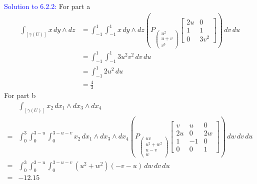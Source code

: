 \documentclass[12pt]{article}
\begin{document}
\smallskip

\textcolor{blue}{Solution to 6.2.2:}
For part a
\begin{align*}
    \int_{[\gamma(U)]} x\, dy \wedge dz
    &= \int_{-1}^1 \int_{-1}^1 x\, dy \wedge dz
        \left(
            P_{\begin{pmatrix}
                u^2 \\ u+v \\ v^3
            \end{pmatrix}}
            \begin{bmatrix}
                2u & 0 \\
                1 & 1 \\
                0 & 3v^2
            \end{bmatrix}
        \right) \,dv \,du \\ 
    &= \int_{-1}^1 \int_{-1}^1 3u^2v^2 \,dv \,du \\
    &= \int_{-1}^1 2u^2 \,du \\
    &= \frac{4}{3}
\end{align*}
For part b
\begin{align*}
    &\int_{[\gamma(U)]} x_2\, dx_1 \wedge dx_3 \wedge dx_4 \\
    =& \int_0^3 \int_0^{3-u} \int_0^{3-u-v} x_2\, dx_1 \wedge dx_3 \wedge dx_4 
        \left(
            P_{\begin{pmatrix}
                uv \\ u^2+w^2 \\ u-v \\ w
            \end{pmatrix}}
            \begin{bmatrix}
                v & u & 0\\
                2u & 0 & 2w\\
                1 & -1 & 0\\
                0 & 0 & 1
            \end{bmatrix}
        \right)
    \,dw \,dv \,du \\
    =& \int_0^3 \int_0^{3-u} \int_0^{3-u-v} (u^2+w^2)(-v-u) \,dw \,dv \,du \\
    =& -12.15
\end{align*}
\end{document}
